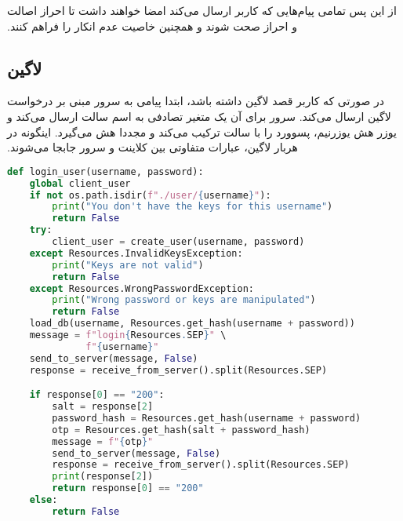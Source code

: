 ‫از این پس تمامی پیام‌هایی که کاربر ارسال می‌کند امضا خواهند داشت تا احراز اصالت و احراز صحت شوند و همچنین خاصیت عدم انکار را فراهم کنند.
‫
‫\subsection{لاگین}
‫در صورتی که کاربر قصد لاگین داشته باشد، ابتدا پیامی به سرور مبنی بر درخواست لاگین ارسال می‌کند. سرور برای آن یک متغیر تصادفی به اسم سالت ارسال می‌کند و یوزر هش یوزرنیم، پسوورد را با سالت ترکیب می‌کند و مجددا هش می‌گیرد. اینگونه در هربار لاگین، عبارات متفاوتی بین کلاینت و سرور جابجا می‌شوند.

\begin{latin}
\begin{lstlisting}[firstnumber=206, language=Python]
def login_user(username, password):
    global client_user
    if not os.path.isdir(f"./user/{username}"):
        print("You don't have the keys for this username")
        return False
    try:
        client_user = create_user(username, password)
    except Resources.InvalidKeysException:
        print("Keys are not valid")
        return False
    except Resources.WrongPasswordException:
        print("Wrong password or keys are manipulated")
        return False
    load_db(username, Resources.get_hash(username + password))
    message = f"login{Resources.SEP}" \
              f"{username}"
    send_to_server(message, False)
    response = receive_from_server().split(Resources.SEP)

    if response[0] == "200":
        salt = response[2]
        password_hash = Resources.get_hash(username + password)
        otp = Resources.get_hash(salt + password_hash)
        message = f"{otp}"
        send_to_server(message, False)
        response = receive_from_server().split(Resources.SEP)
        print(response[2])
        return response[0] == "200"
    else:
        return False
\end{lstlisting}
\end{latin}

